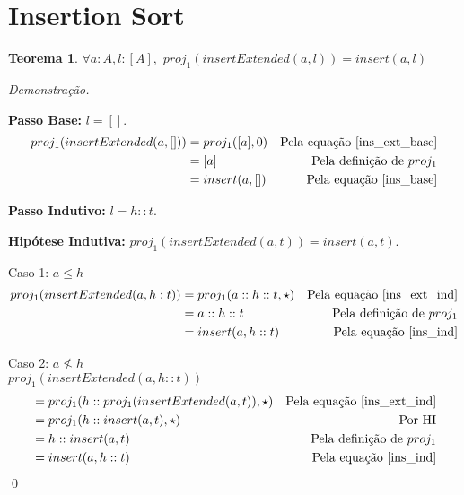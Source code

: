 \documentclass[12pt, oneside, a4paper,english,brazil]{abntex2}
\begin{document}
\section{Insertion Sort}

\newtheorem{teorema}{Teorema}[section]

\newtheorem{lema}{Lema}[section]

\begin{teorema} \label{insert_eq}
  $\forall a : A, l : [A], \,\, proj_1(insertExtended(a, l)) = insert(a, l)$
\end{teorema}
\noindent \textit{Demonstra\c{c}\~ao.}

  \textbf{Passo Base: } $l = []$.
  \begin{align*}
    proj_{1}(insertExtended(a, [])) &= proj_{1}([a], 0)  &\text{Pela equa\c{c}\~ao \ref{ins_ext_base}} \\
                                      &= [a] &\text{Pela defini\c{c}\~ao de } proj_{1} \\
    &= insert(a, [])  &\text{Pela equa\c{c}\~ao \ref{ins_base}}
  \end{align*}

  \textbf{Passo Indutivo: } $l = h :: t$.

  \textbf{Hip\'otese Indutiva: } $proj_{1}(insertExtended(a, t)) = insert(a, t)$.

  Caso 1: $a \le h$
    \begin{align*}
      proj_{1}(insertExtended(a, h : t)) &= proj_{1}(a :: h :: t, \star) &\text{Pela equa\c{c}\~ao \ref{ins_ext_ind}} \\
      &= a :: h :: t &\text{Pela defini\c{c}\~ao de } proj_1 \\
      &= insert(a, h :: t) &\text{Pela equa\c{c}\~ao \ref{ins_ind}}
    \end{align*}
    \newpage

    Caso 2: $a \not\le h$ \\

      $proj_{1}(insertExtended(a, h :: t))$
    \begin{align*}
       &=  proj_{1}(h :: proj_{1}(insertExtended(a, t)), \star) &\text{Pela equa\c{c}\~ao \ref{ins_ext_ind}}\\
       &= proj_{1}(h :: insert(a, t), \star) &\text{Por HI} \\
       &= h :: insert(a, t) &\text{Pela defini\c{c}\~ao de $proj_{1}$} \\
      &= insert(a, h :: t) &\text{Pela equa\c{c}\~ao \ref{ins_ind}}
    \end{align*}
\qed
\end{document}
